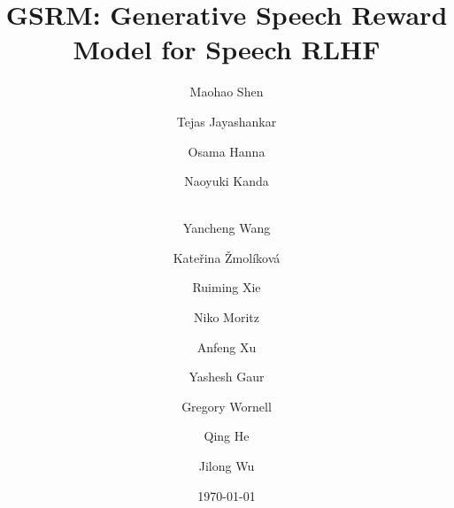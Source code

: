 \documentclass[]{fairmeta}
\title{GSRM: Generative Speech Reward Model for Speech RLHF}
\author[1,2,*,\dagger]{Maohao Shen}
\author[1,*]{Tejas Jayashankar}
\author[1,*]{Osama Hanna}
\author[1,*]{Naoyuki Kanda}
\author[1,3,\dagger]{\\Yancheng Wang}
\author[1]{Kateřina Žmolíková}
\author[1]{Ruiming Xie}
\author[1]{Niko Moritz}
\author[1,4,\dagger]{Anfeng Xu}
\author[1]{Yashesh Gaur}
\author[2]{Gregory Wornell}
\author[1]{Qing He}
\author[1]{Jilong Wu}
\affiliation[1]{Meta Superintelligence Labs}
\affiliation[2]{Massachusetts Institute of Technology}
\affiliation[3]{Arizona State University}
\affiliation[4]{University of Southern California}
\date{\today}
\begin{document}


\maketitle




\clearpage
\newpage



\clearpage
\newpage
\beginappendix


\end{document}
